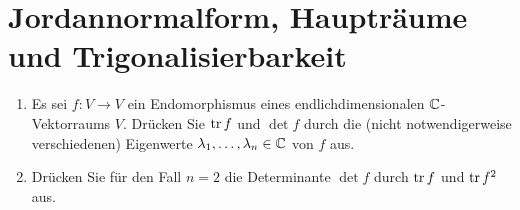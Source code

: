 \section{Jordannormalform, Haupträume und Trigonalisierbarkeit}







\begin{question}[subtitle = Spur und Determinante durch Eigenwerte]{1}
  \begin{enumerate}[leftmargin=*]
    \item
      Es sei $f \colon V \to V$ ein Endomorphismus eines endlichdimensionalen $\mathbb{C}$-Vektorraums $V$.
      Drücken Sie $\operatorname{tr} f$ und $\det f$ durch die (nicht notwendigerweise verschiedenen) Eigenwerte $\lambda_1, \dotsc, \lambda_n \in \mathbb{C}$ von $f$ aus.
    \item
      Drücken Sie für den Fall $n = 2$ die Determinante $\det f$ durch $\operatorname{tr} f$ und $\operatorname{tr} f^2$ aus.
  \end{enumerate}
\end{question}


